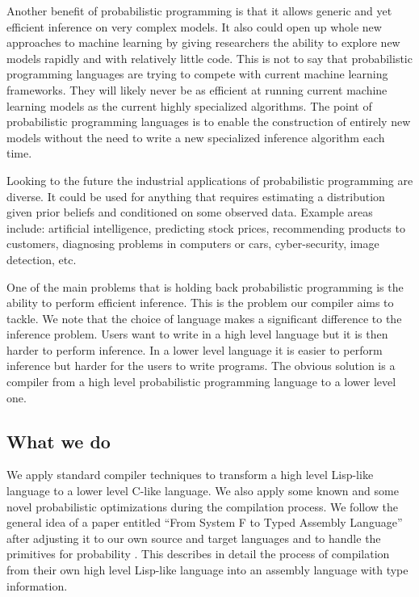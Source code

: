 \documentclass[a4paper]{article}
\begin{document}
Another benefit of probabilistic programming is that it allows generic and yet efficient inference on very complex models. It also could open up whole new approaches to machine learning by giving researchers the ability to explore new models rapidly and with relatively little code. This is not to say that probabilistic programming languages are trying to compete with current machine learning frameworks. They will likely never be as efficient at running current machine learning models as the current highly specialized algorithms. The point of probabilistic programming languages is to enable the construction of entirely new models without the need to write a new specialized inference algorithm each time.

Looking to the future the industrial applications of probabilistic programming are diverse. It could be used for anything that requires estimating a distribution given prior beliefs and conditioned on some observed data. Example areas include: artificial intelligence, predicting stock prices, recommending products to customers, diagnosing problems in computers or cars, cyber-security, image detection, etc.

One of the main problems that is holding back probabilistic programming is the ability to perform efficient inference. This is the problem our compiler aims to tackle. We note that the choice of language makes a significant difference to the inference problem. Users want to write in a high level language but it is then harder to perform inference. In a lower level language it is easier to perform inference but harder for the users to write programs. The obvious solution is a compiler from a high level probabilistic programming language to a lower level one.




\subsection{What we do}

We apply standard compiler techniques to transform a high level Lisp-like language to a lower level C-like language. We also apply some known and some novel probabilistic optimizations during the compilation process. We follow the general idea of a paper entitled ``From System F to Typed Assembly Language'' after adjusting it to our own source and target languages and to handle the primitives for probability \cite{SystemF}. This describes in detail the process of compilation from their own high level Lisp-like language into an assembly language with type information.
\end{document}
